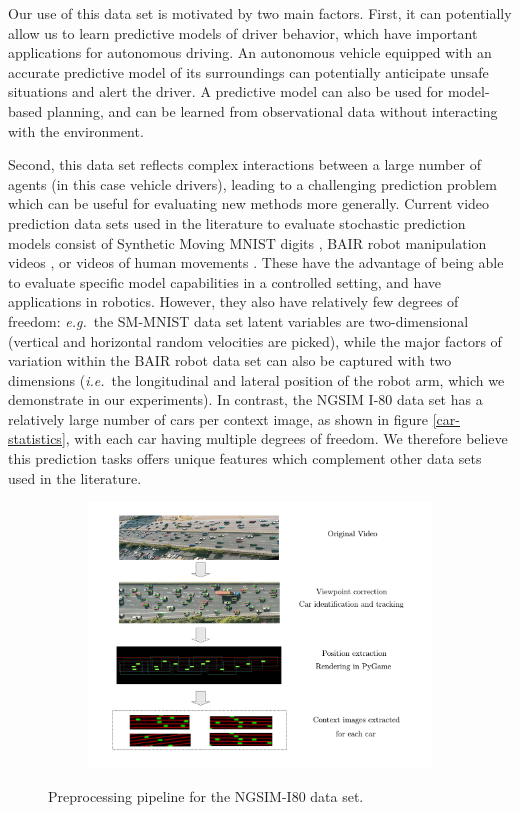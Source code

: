 \documentclass{article}
\begin{document}
Our use of this data set is motivated by two main factors.
First, it can potentially allow us to learn predictive models of driver behavior, which have important applications for autonomous driving.
An autonomous vehicle equipped with an accurate predictive model of its surroundings can potentially anticipate unsafe situations and alert the driver.
A predictive model can also be used for model-based planning, and can be learned from observational data without interacting with the environment.

Second, this data set reflects complex interactions between a large number of agents (in this case vehicle drivers), leading to a challenging prediction problem which can be useful for evaluating new methods more generally.
Current video prediction data sets used in the literature to evaluate stochastic prediction models consist of Synthetic Moving MNIST digits \citep{Denton2018}, BAIR robot manipulation videos \citep{Ebert17}, or videos of human movements \citep{Human}.
These have the advantage of being able to evaluate specific model capabilities in a controlled setting, and have applications in robotics.
However, they also have relatively few degrees of freedom: \emph{e.g.}\ the SM-MNIST data set latent variables are two-dimensional (vertical and horizontal random velocities are picked), while the major factors of variation within the BAIR robot data set can also be captured with two dimensions (\emph{i.e.}\ the longitudinal and lateral position of the robot arm, which we demonstrate in our experiments).
In contrast, the NGSIM I-80 data set has a relatively large number of cars per context image, as shown in figure \ref{car-statistics}, with each car having multiple degrees of freedom.
We therefore believe this prediction tasks offers unique features which complement other data sets used in the literature.

\begin{figure}
  \centering
  \begin{subfigure}[b]{0.8\textwidth}
    \includegraphics[width=\textwidth]{images/i80_preprocess.pdf}
  \end{subfigure}
  \caption{Preprocessing pipeline for the NGSIM-I80 data set.}
\end{figure}
\end{document}
